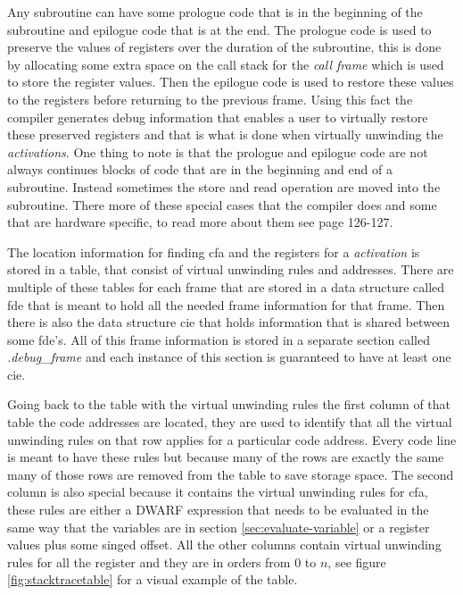 Any subroutine can have some prologue code that is in the beginning of the subroutine  and epilogue code that is at the end.
The prologue code is used to preserve the values of registers over the duration of the subroutine, this is done by allocating some extra space on the call stack for the \emph{call frame} which is used to store the register values.
Then the epilogue code is used to restore these values to the registers before returning to the previous frame.
Using this fact the compiler generates debug information that enables a user to virtually restore these preserved registers and that is what is done when virtually unwinding the \emph{activations}.
One thing to note is that the prologue and epilogue code are not always continues blocks of code that are in the beginning and end of a subroutine.
Instead sometimes the store and read operation are moved into the subroutine.
There more of these special cases that the compiler does and some that are hardware specific, to read more about them see \cite{DWARF} page 126-127.

The location information for finding \gls{cfa} and the registers for a \emph{activation} is stored in a table, that consist of virtual unwinding rules and addresses.
There are multiple of these tables for each frame that are stored in a data structure called \gls{fde} that is meant to hold all the needed frame information for that frame.
Then there is also the data structure \gls{cie} that holds information that is shared between some \acrlong{fde}'s.
All of this frame information is stored in a separate section called \emph{.debug\_frame} and each instance of this section is guaranteed to have at least one \acrlong{cie}.

Going back to the table with the virtual unwinding rules the first column of that table the code addresses are located, they are used to identify that all the virtual unwinding rules on that row applies for a particular code address.
Every code line is meant to have these rules but because many of the rows are exactly the same many of those rows are removed from the table to save storage space.
The second column is also special because it contains the virtual unwinding rules for \gls{cfa}, these rules are either a \gls{DWARF} expression that needs to be evaluated in the same way that the variables are in section \ref{sec:evaluate-variable} or a register values plus some singed offset.
All the other columns contain virtual unwinding rules for all the register and they are in orders from $0$ to $n$, see figure \ref{fig:stacktracetable} for a visual example of the table.


